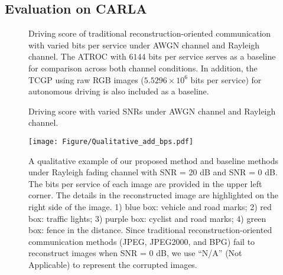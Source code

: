 \subsection{Evaluation on CARLA}

\begin{figure}[t]
    \centering
    \hfill
    \centering
   \caption{Driving score of traditional reconstruction-oriented communication with varied bits per service under AWGN channel and Rayleigh channel. The ATROC with \(6144\) bits per service serves as a baseline for comparison across both channel conditions. In addition, the TCGP using raw RGB images (\(5.5296\times 10^{6}\) bits per service) for autonomous driving is also included as a baseline.}
    \label{fig:score_bps}
\end{figure}


\begin{figure}[t]
    \centering
    \hfill
    \centering
    \caption{Driving score with varied SNRs under AWGN channel and Rayleigh channel.}
\end{figure}

\begin{figure*}[t]
    \centering
    \texttt{[image: Figure/Qualitative\_add\_bps.pdf]}
       \caption{A qualitative example of our proposed method and baseline methods under Rayleigh fading channel with SNR = 20 dB and SNR = 0 dB. The bits per service of each image are provided in the upper left corner. The details in the reconstructed image are highlighted on the right side of the image. 1) blue box: vehicle and road marks; 2) red box: traffic lights; 3) purple box: cyclist and road marks; 4) green box: fence in the distance. Since traditional reconstruction-oriented communication methods (JPEG, JPEG2000, and BPG) fail to reconstruct images when SNR = 0 dB, we use ``N/A'' (Not Applicable) to represent the corrupted images.}
    \label{fig:result_qualitative}
\end{figure*}

